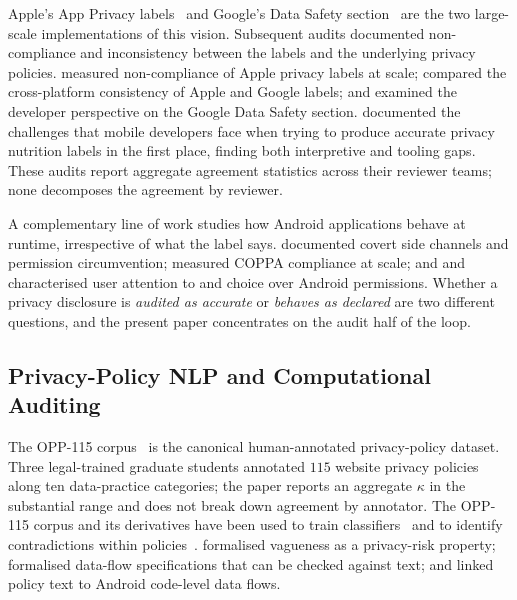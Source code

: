 \documentclass[11pt,a4paper]{article}
\begin{document}
Apple's App Privacy
labels~\citep{appleprivacylabels2020} and Google's Data Safety
section~\citep{googledatasafety2022} are the two large-scale
implementations of this vision. Subsequent audits documented
non-compliance and inconsistency between the labels and the underlying
privacy policies. \citet{xiao2023lalaine} measured non-compliance of
Apple privacy labels at scale; \citet{khandelwal2023comparing}
compared the cross-platform consistency of Apple and Google labels;
and \citet{khandelwal2024unpacking} examined the developer perspective
on the Google Data Safety section. \citet{li2022understanding}
documented the challenges that mobile developers face when trying to
produce accurate privacy nutrition labels in the first place, finding
both interpretive and tooling gaps. These audits report aggregate
agreement statistics across their reviewer teams; none decomposes
the agreement by reviewer.

A complementary line of work studies how Android applications
behave at runtime, irrespective of what the label says.
\citet{reardon2019fifty} documented covert side channels and
permission circumvention; \citet{reyes2018wont} measured COPPA
compliance at scale; and \citet{felt2012android}
and \citet{egelman2013choice} characterised user attention to and
choice over Android permissions. Whether a privacy disclosure is
\emph{audited as accurate} or \emph{behaves as declared} are two
different questions, and the present paper concentrates on the
audit half of the loop.

\subsection{Privacy-Policy NLP and Computational Auditing}
\label{sec:rel-nlp}

The OPP-115 corpus~\citep{wilson2016creation} is the canonical
human-annotated privacy-policy dataset. Three legal-trained graduate
students annotated $115$ website privacy policies along ten
data-practice categories; the paper reports an aggregate $\kappa$ in
the substantial range and does not break down agreement by annotator.
The OPP-115 corpus and its derivatives have been used to train
classifiers~\citep{harkous2018polisis,zimmeck2017automated,
zimmeck2019maps,sathyendra2017identifying} and to identify
contradictions within
policies~\citep{andow2019policylint,andow2020policheck,lippi2019claudette}.
\citet{bhatia2016theory} formalised vagueness as a privacy-risk
property; \citet{breaux2014eddy} formalised data-flow specifications
that can be checked against text; and \citet{slavin2016toward}
linked policy text to Android code-level data flows.
\end{document}
